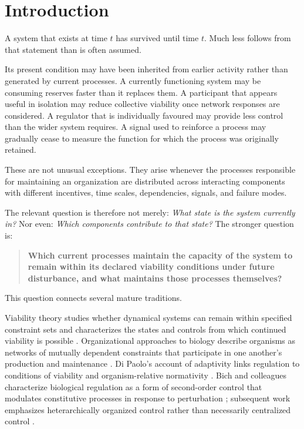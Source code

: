 \section{Introduction}

A system that exists at time \(t\) has survived until time \(t\). Much less follows from that statement than is often assumed.

Its present condition may have been inherited from earlier activity rather than generated by current processes. A currently functioning system may be consuming reserves faster than it replaces them. A participant that appears useful in isolation may reduce collective viability once network responses are considered. A regulator that is individually favoured may provide less control than the wider system requires. A signal used to reinforce a process may gradually cease to measure the function for which the process was originally retained.

These are not unusual exceptions. They arise whenever the processes responsible for maintaining an organization are distributed across interacting components with different incentives, time scales, dependencies, signals, and failure modes.

The relevant question is therefore not merely: \emph{What state is the system currently in?} Nor even: \emph{Which components contribute to that state?} The stronger question is:

\begin{quote}
\textbf{Which current processes maintain the capacity of the system to remain within its declared viability conditions under future disturbance, and what maintains those processes themselves?}
\end{quote}

This question connects several mature traditions.

Viability theory studies whether dynamical systems can remain within specified constraint sets and characterizes the states and controls from which continued viability is possible \citep{aubin1991,aubin2011}. Organizational approaches to biology describe organisms as networks of mutually dependent constraints that participate in one another's production and maintenance \citep{mossio2010,montevil2015,moreno2015}. Di Paolo's account of adaptivity links regulation to conditions of viability and organism-relative normativity \citep{dipaolo2005}. Bich and colleagues characterize biological regulation as a form of second-order control that modulates constitutive processes in response to perturbation \citep{bich2016}; subsequent work emphasizes heterarchically organized control rather than necessarily centralized control \citep{bich2022}.

